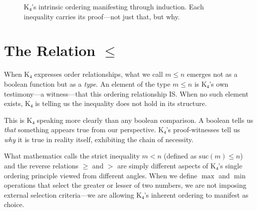 \documentclass[11pt,a4paper]{book}
\begin{document}
\begin{figure}[h]
\centering
{}
\caption{K₄'s intrinsic ordering manifesting through induction. Each inequality carries its proof—not just that, but why.}
\label{fig:order-relation}
\end{figure}

\section{The Relation \texorpdfstring{$\le$}{≤}}

When K₄ expresses order relationships, what we call $m \le n$ emerges not as a boolean function but as a \emph{type}. An element of the type $m \le n$ is K₄'s own testimony—a witness—that this ordering relationship IS. When no such element exists, K₄ is telling us the inequality does not hold in its structure.

This is K₄ speaking more clearly than any boolean comparison. A boolean tells us \emph{that} something appears true from our perspective. K₄'s proof-witnesses tell us \emph{why} it is true in reality itself, exhibiting the chain of necessity.

What mathematics calls the strict inequality $m < n$ (defined as $\mathrm{suc}(m) \le n$) and the reverse relations $\ge$ and $>$ are simply different aspects of K₄'s single ordering principle viewed from different angles. When we define $\max$ and $\min$ operations that select the greater or lesser of two numbers, we are not imposing external selection criteria—we are allowing K₄'s inherent ordering to manifest as choice.
\end{document}
